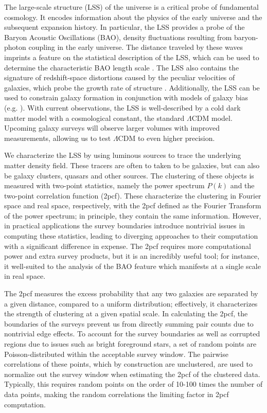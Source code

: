 \documentclass[twocolumn]{aastex62}
\newcommand{\cf}{2pcf\xspace} %
\begin{document}
The large-scale structure (LSS) of the universe is a critical probe of fundamental cosmology. 
It encodes information about the physics of the early universe and the subsequent expansion history.
In particular, the LSS provides a probe of the Baryon Acoustic Oscillations (BAO), density fluctuations resulting from baryon-photon coupling in the early universe.
The distance traveled by these waves imprints a feature on the statistical description of the LSS, which can be used to determine the characteristic BAO length scale \citep{EisensteinHu1998}.
The LSS also contains the signature of redshift-space distortions caused by the peculiar velocities of galaxies, which probe the growth rate of structure \citep{Kaiser1987}.
Additionally, the LSS can be used to constrain galaxy formation in conjunction with models of galaxy bias (e.g. \citealt{Hamilton1988}). %
With current observations, the LSS is well-described by a cold dark matter model with a cosmological constant, the standard $\Lambda$CDM model.
Upcoming galaxy surveys will observe larger volumes with improved measurements, allowing us to test $\Lambda$CDM to even higher precision.

We characterize the LSS by using luminous sources to trace the underlying matter density field.
These tracers are often to taken to be galaxies, but can also be galaxy clusters, quasars and other sources.
The clustering of these objects is measured with two-point statistics, namely the power spectrum $P(k)$ and the two-point correlation function (\cf). %
These characterize the clustering in Fourier space and real space, respectively, with the \cf defined as the Fourier Transform of the power spectrum; in principle, they contain the same information. %
However, in practical applications the survey boundaries introduce nontrivial issues in computing these statistics, leading to diverging approaches to their computation with a significant difference in expense.
The \cf requires more computational power and extra survey products, but it is an incredibly useful tool; for instance, it well-suited to the analysis of the BAO feature which manifests at a single scale in real space.

The \cf measures the excess probability that any two galaxies are separated by a given distance, compared to a uniform distribution; effectively, it characterizes the strength of clustering at a given spatial scale. 
In calculating the \cf, the boundaries of the surveys prevent us from directly summing pair counts due to nontrivial edge effects.
To account for the survey boundaries as well as corrupted regions due to issues such as bright foreground stars, a set of random points are Poisson-distributed within the acceptable survey window. 
The pairwise correlations of these points, which by construction are unclustered, are used to normalize out the survey window when estimating the \cf of the clustered data.
Typically, this requires random points on the order of 10-100 times the number of data points, making the random correlations the limiting factor in \cf computation.
\end{document}
